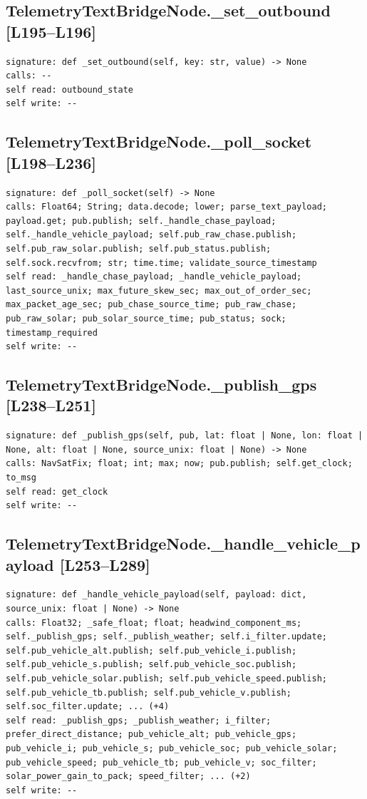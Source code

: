 \documentclass[a4paper,10pt,oneside]{book}
\begin{document}
\subsection*{TelemetryTextBridgeNode.\_set\_outbound [L195--L196]}
\begin{lstlisting}[numbers=none]
signature: def _set_outbound(self, key: str, value) -> None
calls: --
self read: outbound_state
self write: --
\end{lstlisting}
\subsection*{TelemetryTextBridgeNode.\_poll\_socket [L198--L236]}
\begin{lstlisting}[numbers=none]
signature: def _poll_socket(self) -> None
calls: Float64; String; data.decode; lower; parse_text_payload; payload.get; pub.publish; self._handle_chase_payload; self._handle_vehicle_payload; self.pub_raw_chase.publish; self.pub_raw_solar.publish; self.pub_status.publish; self.sock.recvfrom; str; time.time; validate_source_timestamp
self read: _handle_chase_payload; _handle_vehicle_payload; last_source_unix; max_future_skew_sec; max_out_of_order_sec; max_packet_age_sec; pub_chase_source_time; pub_raw_chase; pub_raw_solar; pub_solar_source_time; pub_status; sock; timestamp_required
self write: --
\end{lstlisting}
\subsection*{TelemetryTextBridgeNode.\_publish\_gps [L238--L251]}
\begin{lstlisting}[numbers=none]
signature: def _publish_gps(self, pub, lat: float | None, lon: float | None, alt: float | None, source_unix: float | None) -> None
calls: NavSatFix; float; int; max; now; pub.publish; self.get_clock; to_msg
self read: get_clock
self write: --
\end{lstlisting}
\subsection*{TelemetryTextBridgeNode.\_handle\_vehicle\_payload [L253--L289]}
\begin{lstlisting}[numbers=none]
signature: def _handle_vehicle_payload(self, payload: dict, source_unix: float | None) -> None
calls: Float32; _safe_float; float; headwind_component_ms; self._publish_gps; self._publish_weather; self.i_filter.update; self.pub_vehicle_alt.publish; self.pub_vehicle_i.publish; self.pub_vehicle_s.publish; self.pub_vehicle_soc.publish; self.pub_vehicle_solar.publish; self.pub_vehicle_speed.publish; self.pub_vehicle_tb.publish; self.pub_vehicle_v.publish; self.soc_filter.update; ... (+4)
self read: _publish_gps; _publish_weather; i_filter; prefer_direct_distance; pub_vehicle_alt; pub_vehicle_gps; pub_vehicle_i; pub_vehicle_s; pub_vehicle_soc; pub_vehicle_solar; pub_vehicle_speed; pub_vehicle_tb; pub_vehicle_v; soc_filter; solar_power_gain_to_pack; speed_filter; ... (+2)
self write: --
\end{lstlisting}
\end{document}
